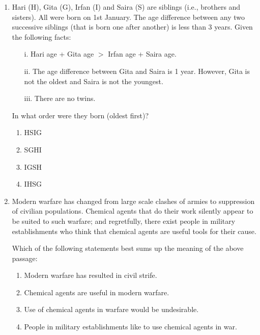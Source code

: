 \documentclass[journal,12pt,onecolumn]{IEEEtran}
\theoremstyle{remark}
\begin{document}
\begin{enumerate}
\item Hari (H), Gita (G), Irfan (I) and Saira (S) are siblings (i.e., brothers and sisters). All were born on 1st January. The age difference between any two successive siblings (that is born one after another) is less than 3 years. Given the following facts:
\begin{enumerate}
    \item[i.] Hari age + Gita age $> $ Irfan  age + Saira age.
    \item[ii.] The age difference between Gita and Saira is 1 year. However, Gita is not the oldest and Saira is not the youngest.
    \item[iii.] There are no twins.
\end{enumerate}
In what order were they born (oldest first)?
\begin{enumerate}
    \item HSIG
    \item SGHI
    \item IGSH
    \item IHSG
\end{enumerate}

\item Modern warfare has changed from large scale clashes of armies to suppression of civilian populations. Chemical agents that do their work silently appear to be suited to such warfare; and regretfully, there exist people in military establishments who think that chemical agents are useful tools for their cause.

Which of the following statements best sums up the meaning of the above passage:
\begin{enumerate}
    \item Modern warfare has resulted in civil strife.
    \item Chemical agents are useful in modern warfare.
    \item Use of chemical agents in warfare would be undesirable.
    \item People in military establishments like to use chemical agents in war.
\end{enumerate}


\end{enumerate}
\end{document}
